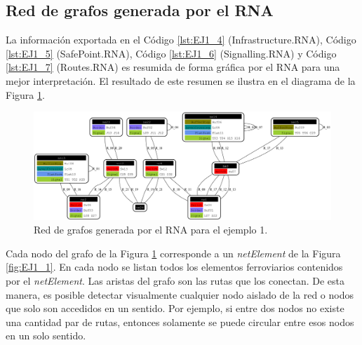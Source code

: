 \subsection{Red de grafos generada por el RNA}
	
 	La información exportada en el Código \ref{lst:EJ1_4} (Infrastructure.RNA), Código \ref{lst:EJ1_5} (SafePoint.RNA), Código \ref{lst:EJ1_6} (Signalling.RNA) y Código \ref{lst:EJ1_7} (Routes.RNA) es resumida de forma gráfica por el RNA para una mejor interpretación. El resultado de este resumen se ilustra en el diagrama de la Figura \ref{fig:EJ1_8}.

	\begin{figure}[H]
		\centering
		\includegraphics[origin = c, width=\textwidth]{Figuras/Graph_1}
		\centering\caption{Red de grafos generada por el RNA para el ejemplo 1.}
		\label{fig:EJ1_8}
	\end{figure}
	
	Cada nodo del grafo de la Figura \ref{fig:EJ1_8} corresponde a un \textit{netElement} de la Figura \ref{fig:EJ1_1}. En cada nodo se listan todos los elementos ferroviarios contenidos por el \textit{netElement}. Las aristas del grafo son las rutas que los conectan. De esta manera, es posible detectar visualmente cualquier nodo aislado de la red o nodos que solo son accedidos en un sentido. Por ejemplo, si entre dos nodos no existe una cantidad par de rutas, entonces solamente se puede circular entre esos nodos en un solo sentido.